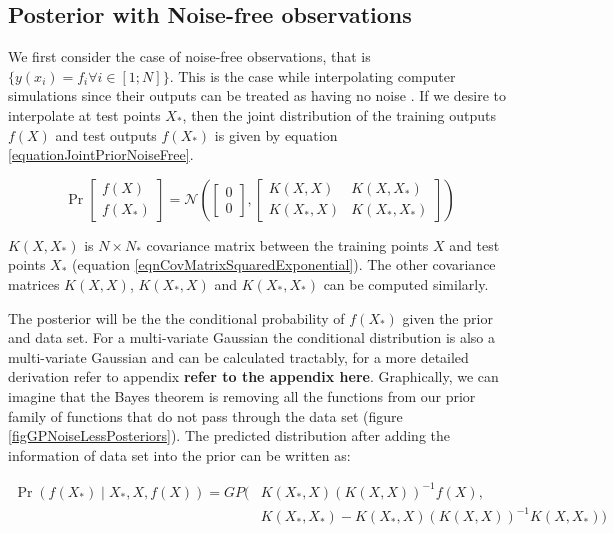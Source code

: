 \subsection{Posterior with Noise-free observations}\label{subSecPosteriorNoiseFree}
We first consider the case of noise-free observations, that is $\{y(x_{i}) = f_{i} \forall i \in [1; N] \}$. This is the case while interpolating computer simulations since their outputs can be treated as having no noise \cite{sacks1989design}. If we desire to interpolate at test points $X_{*}$, then the joint distribution of the training outputs $f(X)$ and test outputs $f(X_{*})$ is given by equation \ref{equationJointPriorNoiseFree}.

\begin{equation}\label{equationJointPriorNoiseFree}
\Pr\left [ \begin{matrix}
f(X)
\\ f(X_{*})
\end{matrix} \right ] = 
\mathcal{N}\left (\left [ \begin{matrix} 0 \\ 0 \end{matrix} \right ]
, 
\left [ \begin{matrix}
K(X, X) & K(X, X_{*})\\ 
K(X_{*}, X) & K(X_{*}, X_{*})
\end{matrix} \right ]
\right)
\end{equation}

$K(X, X_{*})$ is $N \times N_{*}$ covariance matrix between the training points $X$ and test points $X_{*}$ (equation \ref{eqnCovMatrixSquaredExponential}). The other covariance matrices $K(X, X)$, $K(X_{*}, X)$ and $K(X_{*}, X_{*})$ can be computed similarly. 

The posterior will be the the conditional probability of $f(X_{*})$ given the prior and data set. For a multi-variate Gaussian the conditional distribution is also a multi-variate Gaussian and can be calculated tractably, for a more detailed derivation refer to appendix \textbf{refer to the appendix here}. Graphically, we can imagine that the Bayes theorem is removing all the functions from our prior family of functions that do not pass through the data set (figure \ref{figGPNoiseLessPosteriors}). The predicted distribution after adding the information of data set into the prior can be written as:

  \begin{equation}\label{eqNoiseFreePosteriorGP}
  \begin{aligned}
  \Pr(f(X_{*}) \mid X_{*}, X, f(X)) = GP(  & K(X_{*}, X)( K(X, X) )^{-1}f(X),   \\ 
                                & K(X_{*}, X_{*}) - K(X_{*}, X)( K(X, X) )^{-1} K(X, X_{*}))
  \end{aligned}
  \end{equation}

